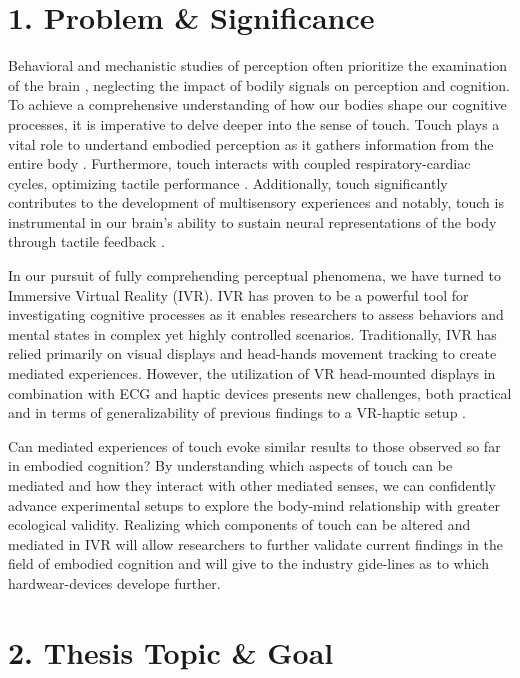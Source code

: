 \documentclass[12pt,oneside,openright]{report}
\begin{document}
\section*{1. Problem \& Significance}

Behavioral and mechanistic studies of perception often prioritize the examination of the brain \cite{Hofmann2021}, neglecting the impact of bodily signals on perception and cognition. To achieve a comprehensive understanding of how our bodies shape our cognitive processes, it is imperative to delve deeper into the sense of touch. Touch plays a vital role to undertand embodied perception as it gathers information from the entire body \cite*{Field2014}.  Furthermore, touch interacts with coupled respiratory-cardiac cycles, optimizing tactile performance \cite{Grund643,SALTAFOSSI2023108642}.  Additionally, touch significantly contributes to the development of multisensory experiences \cite{BREMNER2017227} and notably, touch is instrumental in our brain's ability to sustain neural representations of the body through tactile feedback \cite{Cole2016}.

In our pursuit of fully comprehending perceptual phenomena, we have turned to Immersive Virtual Reality (IVR). IVR has proven to be a powerful tool for investigating cognitive processes as it enables researchers to assess behaviors and mental states in complex yet highly controlled scenarios. Traditionally, IVR has relied primarily on visual displays and head-hands movement tracking to create mediated experiences. However, the utilization of VR head-mounted displays in combination with ECG and haptic devices presents new challenges, both practical and in terms of generalizability of previous findings to a VR-haptic setup \cite*{Klotzsche2023}.

Can mediated experiences of touch evoke similar results to those observed so far in embodied cognition? By understanding which aspects of touch can be mediated and how they interact with other mediated senses, we can confidently advance experimental setups to explore the body-mind relationship with greater ecological validity. Realizing which components of touch can be altered and mediated in IVR will allow researchers to further validate current findings in the field of embodied cognition and will give to the industry gide-lines as to which hardwear-devices develope further.  

\section*{2. Thesis Topic \& Goal}
\end{document}
